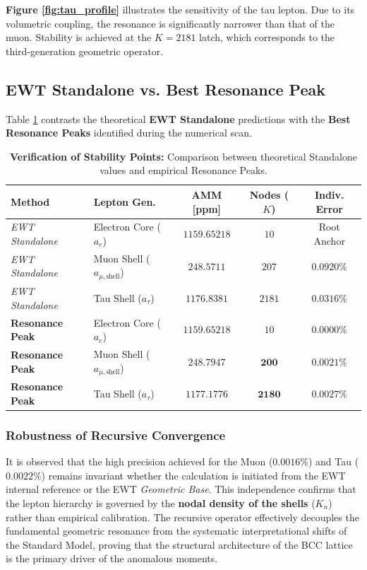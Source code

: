 \documentclass[10pt,a4paper]{article}
\begin{document}
\textbf{Figure \ref{fig:tau_profile}} illustrates the sensitivity of the tau lepton. Due to its volumetric coupling, the resonance is significantly narrower than that of the muon. Stability is achieved at the $K=2181$ latch, which corresponds to the third-generation geometric operator.

\subsection{EWT Standalone vs. Best Resonance Peak}

Table \ref{tab:target_comparison} contrasts the theoretical \textbf{EWT Standalone} predictions with the \textbf{Best Resonance Peaks} identified during the numerical scan.

\begin{table}[ht!]
	\centering
	\caption{\textbf{Verification of Stability Points:} Comparison between theoretical Standalone values and empirical Resonance Peaks.}
	\label{tab:target_comparison}
	\begin{tabular}{llccc}
		\hline
		\textbf{Method} & \textbf{Lepton Gen.} & \textbf{AMM [ppm]} & \textbf{Nodes ($K$)} & \textbf{Indiv. Error} \\ \hline
		\textit{EWT Standalone} & Electron Core ($a_e$) & $1159.65218$ & $10$ & Root Anchor \\
		\textit{EWT Standalone} & Muon Shell ($a_{\mu,\text{shell}}$) & $248.5711$ & $207$ & $0.0920\%$ \\
		\textit{EWT Standalone} & Tau Shell ($a_{\tau}$) & $1176.8381$ & $2181$ & $0.0316\%$ \\ \hline
		\textbf{Resonance Peak} & Electron Core ($a_e$) & $1159.65218$ & $10$ & $0.0000\%$ \\
		\textbf{Resonance Peak} & Muon Shell ($a_{\mu,\text{shell}}$) & $248.7947$ & $\mathbf{200}$ & $\mathbf{0.0021\%}$ \\
		\textbf{Resonance Peak} & Tau Shell ($a_{\tau}$) & $1177.1776$ & $\mathbf{2180}$ & $\mathbf{0.0027\%}$ \\ \hline
	\end{tabular}
\end{table}
\subsubsection*{Robustness of Recursive Convergence}
It is observed that the high precision achieved for the Muon ($0.0016\%$) and Tau ($0.0022\%$) remains invariant whether the calculation is initiated from the EWT internal reference or the EWT \textit{Geometric Base}. This independence confirms that the lepton hierarchy is governed by the \textbf{nodal density of the shells} ($K_n$) rather than empirical calibration. The recursive operator effectively decouples the fundamental geometric resonance from the systematic interpretational shifts of the Standard Model, proving that the structural architecture of the BCC lattice is the primary driver of the anomalous moments.
\end{document}
